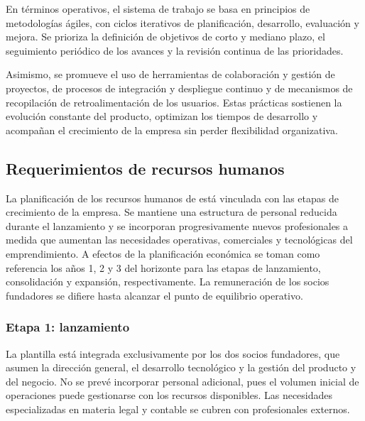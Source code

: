 En términos operativos, el sistema de trabajo se basa en principios de metodologías ágiles, con ciclos iterativos de planificación, desarrollo, evaluación y mejora. Se prioriza la definición de objetivos de corto y mediano plazo, el seguimiento periódico de los avances y la revisión continua de las prioridades.

Asimismo, se promueve el uso de herramientas de colaboración y gestión de proyectos, de procesos de integración y despliegue continuo y de mecanismos de recopilación de retroalimentación de los usuarios. Estas prácticas sostienen la evolución constante del producto, optimizan los tiempos de desarrollo y acompañan el crecimiento de la empresa sin perder flexibilidad organizativa.

\subsection{Requerimientos de recursos humanos}
La planificación de los recursos humanos de \nombreproyecto{} está vinculada con las etapas de crecimiento de la empresa. Se mantiene una estructura de personal reducida durante el lanzamiento y se incorporan progresivamente nuevos profesionales a medida que aumentan las necesidades operativas, comerciales y tecnológicas del emprendimiento. A efectos de la planificación económica se toman como referencia los años 1, 2 y 3 del horizonte para las etapas de lanzamiento, consolidación y expansión, respectivamente. La remuneración de los socios fundadores se difiere hasta alcanzar el punto de equilibrio operativo.

\subsubsection{Etapa 1: lanzamiento}
La plantilla está integrada exclusivamente por los dos socios fundadores, que asumen la dirección general, el desarrollo tecnológico y la gestión del producto y del negocio. No se prevé incorporar personal adicional, pues el volumen inicial de operaciones puede gestionarse con los recursos disponibles. Las necesidades especializadas en materia legal y contable se cubren con profesionales externos.

